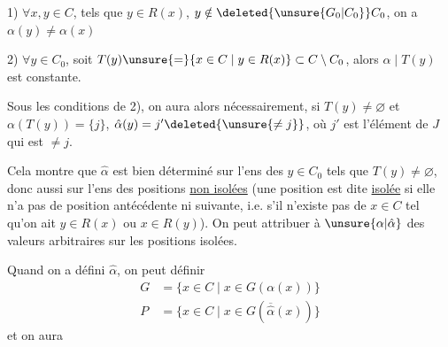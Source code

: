 1) $\forall x,y\in C$, tels que $y\in R(x)$, $y\notin\deleted{\unsure{G_0|C_0}} C_0$, on a $\alpha(y)\ne\alpha(x)$

2) $\forall y\in C_0$, soit $T(y)\unsure{=}\{x\in C\mid y\in R(x)\}\subset C\setminus C_0$, alors $\alpha\mid T(y)$ est constante.

Sous les conditions de 2), on aura alors nécessairement, si $T(y)\ne\varnothing$ et $\alpha(T(y))=\{j\}$, $\hat\alpha(y)=j'\deleted{\unsure{\ne j}}$, où $j'$ est l'élément de $J$ qui est $\ne j$.

Cela montre que $\hat\alpha$ est bien déterminé sur l'ens  des $y\in C_0$ tels que $T(y)\ne\varnothing$, donc aussi sur l'ens des positions \uline{non isolées} (une position  est dite \uline{isolée} si elle n'a pas de position antécédente ni suivante, i.e. s'il n'existe pas de $x\in C$ tel qu'on ait $y\in R(x)$ ou $x\in R(y)$). On peut attribuer à $\unsure{\alpha|\hat\alpha}$ des valeurs arbitraires sur les positions isolées.

Quand on a défini  $\hat\alpha$, on peut définir
\[
\begin{aligned}
G&=\{x\in C\mid x\in G(\alpha(x))\}\\
P&=\{x\in C\mid x\in G(\overline{\hat\alpha}(x))\}
\end{aligned}
\]
et on  aura
